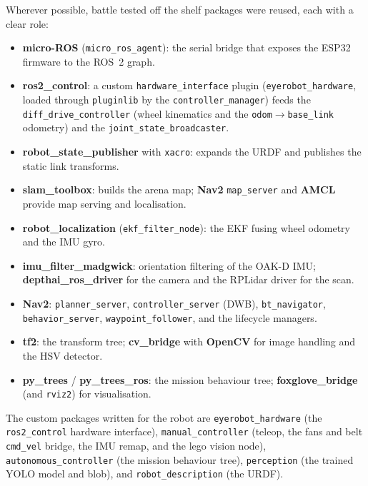 \documentclass[11pt]{article}
\begin{document}
Wherever possible, battle tested off the shelf packages were reused, each with a clear role:
\begin{itemize}[noitemsep]
    \item \textbf{micro-ROS} (\texttt{micro\_ros\_agent}): the serial bridge that exposes the ESP32 firmware to the ROS~2 graph.
    \item \textbf{ros2\_control}: a custom \texttt{hardware\_interface} plugin (\texttt{eyerobot\_hardware}, loaded through \texttt{pluginlib} by the \texttt{controller\_manager}) feeds the \texttt{diff\_drive\_controller} (wheel kinematics and the \texttt{odom}$\rightarrow$\texttt{base\_link} odometry) and the \texttt{joint\_state\_broadcaster}.
    \item \textbf{robot\_state\_publisher} with \texttt{xacro}: expands the URDF and publishes the static link transforms.
    \item \textbf{slam\_toolbox}: builds the arena map; \textbf{Nav2} \texttt{map\_server} and \textbf{AMCL} provide map serving and localisation.
    \item \textbf{robot\_localization} (\texttt{ekf\_filter\_node}): the EKF fusing wheel odometry and the IMU gyro.
    \item \textbf{imu\_filter\_madgwick}: orientation filtering of the OAK-D IMU; \textbf{depthai\_ros\_driver} for the camera and the RPLidar driver for the scan.
    \item \textbf{Nav2}: \texttt{planner\_server}, \texttt{controller\_server} (DWB), \texttt{bt\_navigator}, \texttt{behavior\_server}, \texttt{waypoint\_follower}, and the lifecycle managers.
    \item \textbf{tf2}: the transform tree; \textbf{cv\_bridge} with \textbf{OpenCV} for image handling and the HSV detector.
    \item \textbf{py\_trees} / \textbf{py\_trees\_ros}: the mission behaviour tree; \textbf{foxglove\_bridge} (and \texttt{rviz2}) for visualisation.
\end{itemize}
The custom packages written for the robot are \texttt{eyerobot\_hardware} (the \texttt{ros2\_control} hardware interface), \texttt{manual\_controller} (teleop, the fans and belt \texttt{cmd\_vel} bridge, the IMU remap, and the lego vision node), \texttt{autonomous\_controller} (the mission behaviour tree), \texttt{perception} (the trained YOLO model and blob), and \texttt{robot\_description} (the URDF).
\end{document}

